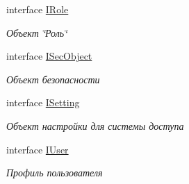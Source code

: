 \begin{DoxyCompactItemize}
interface \hyperlink{interface_security_1_1_interfaces_1_1_model_1_1_i_role}{I\+Role}
\begin{DoxyCompactList}\small\item\em Объект \char`\"{}Роль\char`\"{} \end{DoxyCompactList}\item 
interface \hyperlink{interface_security_1_1_interfaces_1_1_model_1_1_i_sec_object}{I\+Sec\+Object}
\begin{DoxyCompactList}\small\item\em Объект безопасности \end{DoxyCompactList}\item 
interface \hyperlink{interface_security_1_1_interfaces_1_1_model_1_1_i_setting}{I\+Setting}
\begin{DoxyCompactList}\small\item\em Объект настройки для системы доступа \end{DoxyCompactList}\item 
interface \hyperlink{interface_security_1_1_interfaces_1_1_model_1_1_i_user}{I\+User}
\begin{DoxyCompactList}\small\item\em Профиль пользователя \end{DoxyCompactList}\end{DoxyCompactItemize}
